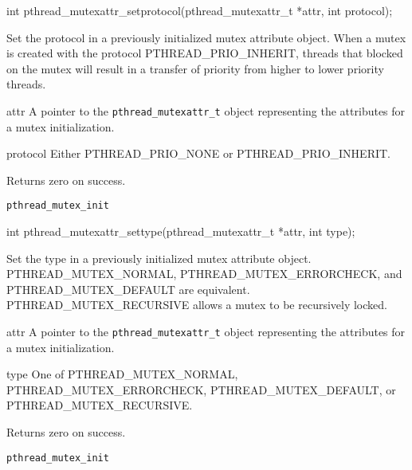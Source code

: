 \begin{apisyn}

	\funcproto int pthread_mutexattr_setprotocol(pthread_mutexattr_t *attr,
                                                     int protocol);
\end{apisyn}
\begin{apidesc}
	Set the protocol in a previously initialized mutex
	attribute object. When a mutex is created with the protocol
	PTHREAD_PRIO_INHERIT, threads that blocked on the mutex will result
	in a transfer of priority from higher to lower priority threads.
\end{apidesc}
\begin{apiparm}
	\item[attr]
		A pointer to the {\tt pthread_mutexattr_t} object
		representing the attributes for a mutex initialization.
	\item[protocol]
		Either PTHREAD_PRIO_NONE or PTHREAD_PRIO_INHERIT.
\end{apiparm}
\begin{apiret}
	Returns zero on success.
\end{apiret}
\begin{apirel}
	{\tt pthread_mutex_init}
\end{apirel}


\begin{apisyn}

	\funcproto int pthread_mutexattr_settype(pthread_mutexattr_t *attr,
                                                 int type);
\end{apisyn}
\begin{apidesc}
	Set the type in a previously initialized mutex
	attribute object. PTHREAD_MUTEX_NORMAL, PTHREAD_MUTEX_ERRORCHECK,
	and PTHREAD_MUTEX_DEFAULT are equivalent. PTHREAD_MUTEX_RECURSIVE
	allows a mutex to be recursively locked.
\end{apidesc}
\begin{apiparm}
	\item[attr]
		A pointer to the {\tt pthread_mutexattr_t} object
		representing the attributes for a mutex initialization.
	\item[type]
		One of PTHREAD_MUTEX_NORMAL, PTHREAD_MUTEX_ERRORCHECK,
		PTHREAD_MUTEX_DEFAULT, or PTHREAD_MUTEX_RECURSIVE.
\end{apiparm}
\begin{apiret}
	Returns zero on success.
\end{apiret}
\begin{apirel}
	{\tt pthread_mutex_init}
\end{apirel}


